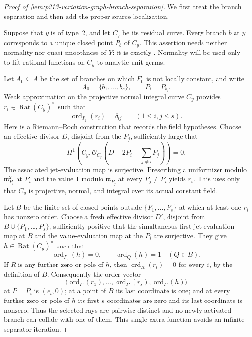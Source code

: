 \begin{proof}[Proof of
\cref{lem:p213-variation-graph-branch-separation}]
We first treat the branch separation and then add the proper source
localization.

Suppose that $y$ is of type~$2$, and let $C_y$ be its residual curve.
Every branch $b$ at $y$ corresponds to a unique closed point $P_b$ of
$C_y$.  This assertion needs neither normality nor quasi-smoothness of
$Y$: it is exactly
\cite[Theorem~4.2.10 and §4.2.11.1]{Ducros24CurveStructure}.  Normality
will be used only to lift rational functions on $C_y$ to analytic unit
germs.

Let $A_0\subseteq A$ be the set of branches on which $F_0$ is not
locally constant, and write
\[
                     A_0=\{b_1,\ldots,b_s\},
             \qquad P_i=P_{b_i}.
\]
Weak approximation on the projective normal integral curve $C_y$
provides $r_i\in\operatorname{Rat}(C_y)^\times$ such that
\begin{equation}
       \operatorname{ord}_{P_j}(r_i)=\delta_{ij}
       \qquad(1\leq i,j\leq s).
 \label{eq:p213-variation-first-order-block}
\end{equation}
Here is a Riemann--Roch construction that records the field hypotheses.
Choose an effective divisor $D$, disjoint from the $P_j$, sufficiently
large that
\[
 H^1\!\left(C_y,
   \mathcal O_{C_y}\!\left(D-2P_i-\sum_{j\ne i}P_j\right)\right)=0.
\]
The associated jet-evaluation map is surjective.  Prescribing a
uniformizer modulo $\mathfrak m_{P_i}^2$ at $P_i$ and the value $1$
modulo $\mathfrak m_{P_j}$ at every $P_j\ne P_i$ yields $r_i$.
This uses only that $C_y$ is projective, normal, and integral over its
actual constant field.

Let $B$ be the finite set of closed points outside
$\{P_1,\ldots,P_s\}$ at which at least one $r_i$ has nonzero order.
Choose a fresh effective divisor $D'$, disjoint from
$B\cup\{P_1,\ldots,P_s\}$, sufficiently positive that the simultaneous
first-jet evaluation map at $B$ and the value-evaluation map at the $P_i$
are surjective.  They give $h\in\operatorname{Rat}(C_y)^\times$ such that
\begin{equation}
 \operatorname{ord}_{P_i}(h)=0,
 \qquad
 \operatorname{ord}_{Q}(h)=1
 \quad(Q\in B).
 \label{eq:p213-variation-collision-killer}
\end{equation}
If $R$ is any further zero or pole of $h$, then
$\operatorname{ord}_R(r_i)=0$ for every $i$, by the definition of $B$.
Consequently the order vector
\begin{equation}
 \bigl(\operatorname{ord}_P(r_1),\ldots,
       \operatorname{ord}_P(r_s),\operatorname{ord}_P(h)\bigr)
 \label{eq:p213-variation-order-vector}
\end{equation}
at $P=P_i$ is $(e_i,0)$; at a point of $B$ its last coordinate is one;
and at every further zero or pole of $h$ its first $s$ coordinates are
zero and its last coordinate is nonzero.  Thus the selected rays are
pairwise distinct and no newly activated branch can collide with one of
them.  This single extra function avoids an infinite separator iteration.


\end{proof}
